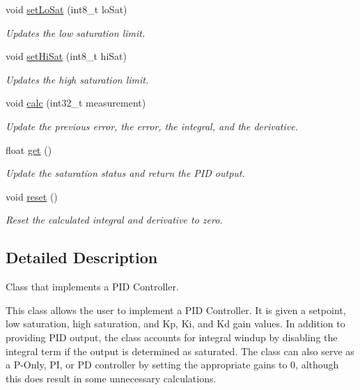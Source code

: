 \begin{DoxyCompactItemize}
void \mbox{\hyperlink{class_p_i_d_controller_ab1ef75c91c9d2c7e52c328194063d870}{set\+Lo\+Sat}} (int8\+\_\+t lo\+Sat)
\begin{DoxyCompactList}\small\item\em Updates the low saturation limit. \end{DoxyCompactList}\item 
void \mbox{\hyperlink{class_p_i_d_controller_ad71f9567e88aabf607375c0f5c513a92}{set\+Hi\+Sat}} (int8\+\_\+t hi\+Sat)
\begin{DoxyCompactList}\small\item\em Updates the high saturation limit. \end{DoxyCompactList}\item 
void \mbox{\hyperlink{class_p_i_d_controller_adfe56699c7f330bdacbd1240ca7e1a38}{calc}} (int32\+\_\+t measurement)
\begin{DoxyCompactList}\small\item\em Update the previous error, the error, the integral, and the derivative. \end{DoxyCompactList}\item 
float \mbox{\hyperlink{class_p_i_d_controller_a9691a50160d89b3aac20fad29293a797}{get}} ()
\begin{DoxyCompactList}\small\item\em Update the saturation status and return the P\+ID output. \end{DoxyCompactList}\item 
void \mbox{\hyperlink{class_p_i_d_controller_ab6adfbffa30414f0a83b95ba999a2fea}{reset}} ()
\begin{DoxyCompactList}\small\item\em Reset the calculated integral and derivative to zero. \end{DoxyCompactList}\end{DoxyCompactItemize}


\subsection{Detailed Description}
Class that implements a P\+ID Controller. 

This class allows the user to implement a P\+ID Controller. It is given a setpoint, low saturation, high saturation, and Kp, Ki, and Kd gain values. In addition to providing P\+ID output, the class accounts for integral windup by disabling the integral term if the output is determined as saturated. The class can also serve as a P-\/\+Only, PI, or PD controller by setting the appropriate gains to 0, although this does result in some unnecessary calculations. 

